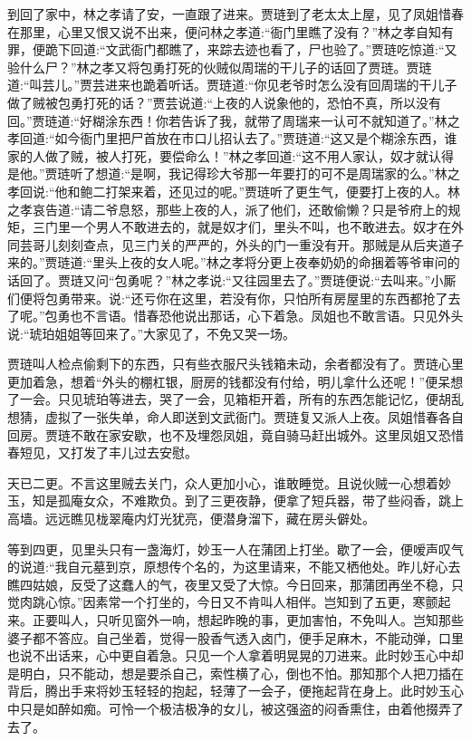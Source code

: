 \begin{parag}
    到回了家中，林之孝请了安，一直跟了进来。贾琏到了老太太上屋，见了凤姐惜春在那里，心里又恨又说不出来，便问林之孝道:“衙门里瞧了没有？”林之孝自知有罪，便跪下回道:“文武衙门都瞧了，来踪去迹也看了，尸也验了。”贾琏吃惊道:“又验什么尸？”林之孝又将包勇打死的伙贼似周瑞的干儿子的话回了贾琏。贾琏道:“叫芸儿。”贾芸进来也跪着听话。贾琏道:“你见老爷时怎么没有回周瑞的干儿子做了贼被包勇打死的话？”贾芸说道:“上夜的人说象他的，恐怕不真，所以没有回。”贾琏道:“好糊涂东西！你若告诉了我，就带了周瑞来一认可不就知道了。”林之孝回道:“如今衙门里把尸首放在市口儿招认去了。”贾琏道:“这又是个糊涂东西，谁家的人做了贼，被人打死，要偿命么！”林之孝回道:“这不用人家认，奴才就认得是他。”贾琏听了想道:“是啊，我记得珍大爷那一年要打的可不是周瑞家的么。”林之孝回说:“他和鲍二打架来着，还见过的呢。”贾琏听了更生气，便要打上夜的人。林之孝哀告道:“请二爷息怒，那些上夜的人，派了他们，还敢偷懒？只是爷府上的规矩，三门里一个男人不敢进去的，就是奴才们，里头不叫，也不敢进去。奴才在外同芸哥儿刻刻查点，见三门关的严严的，外头的门一重没有开。那贼是从后夹道子来的。”贾琏道:“里头上夜的女人呢。”林之孝将分更上夜奉奶奶的命捆着等爷审问的话回了。贾琏又问“包勇呢？”林之孝说:“又往园里去了。”贾琏便说:“去叫来。”小厮们便将包勇带来。说:“还亏你在这里，若没有你，只怕所有房屋里的东西都抢了去了呢。”包勇也不言语。惜春恐他说出那话，心下着急。凤姐也不敢言语。只见外头说:“琥珀姐姐等回来了。”大家见了，不免又哭一场。
\end{parag}


\begin{parag}
    贾琏叫人检点偷剩下的东西，只有些衣服尺头钱箱未动，余者都没有了。贾琏心里更加着急，想着“外头的棚杠银，厨房的钱都没有付给，明儿拿什么还呢！”便呆想了一会。只见琥珀等进去，哭了一会，见箱柜开着，所有的东西怎能记忆，便胡乱想猜，虚拟了一张失单，命人即送到文武衙门。贾琏复又派人上夜。凤姐惜春各自回房。贾琏不敢在家安歇，也不及埋怨凤姐，竟自骑马赶出城外。这里凤姐又恐惜春短见，又打发了丰儿过去安慰。
\end{parag}


\begin{parag}
    天已二更。不言这里贼去关门，众人更加小心，谁敢睡觉。且说伙贼一心想着妙玉，知是孤庵女众，不难欺负。到了三更夜静，便拿了短兵器，带了些闷香，跳上高墙。远远瞧见栊翠庵内灯光犹亮，便潜身溜下，藏在房头僻处。
\end{parag}


\begin{parag}
    等到四更，见里头只有一盏海灯，妙玉一人在蒲团上打坐。歇了一会，便嗳声叹气的说道:“我自元墓到京，原想传个名的，为这里请来，不能又栖他处。昨儿好心去瞧四姑娘，反受了这蠢人的气，夜里又受了大惊。今日回来，那蒲团再坐不稳，只觉肉跳心惊。”因素常一个打坐的，今日又不肯叫人相伴。岂知到了五更，寒颤起来。正要叫人，只听见窗外一响，想起昨晚的事，更加害怕，不免叫人。岂知那些婆子都不答应。自己坐着，觉得一股香气透入卤门，便手足麻木，不能动弹，口里也说不出话来，心中更自着急。只见一个人拿着明晃晃的刀进来。此时妙玉心中却是明白，只不能动，想是要杀自己，索性横了心，倒也不怕。那知那个人把刀插在背后，腾出手来将妙玉轻轻的抱起，轻薄了一会子，便拖起背在身上。此时妙玉心中只是如醉如痴。可怜一个极洁极净的女儿，被这强盗的闷香熏住，由着他掇弄了去了。
\end{parag}


